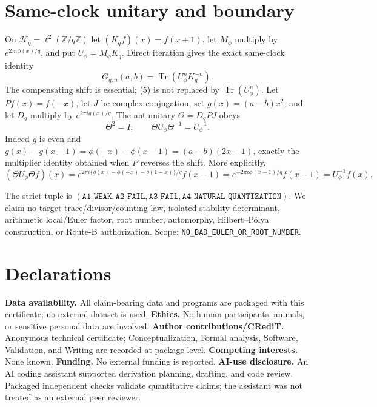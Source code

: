 \documentclass[10pt]{article}
\begin{document}
\section{Same-clock unitary and boundary}
On $\mathcal H_q=\ell^2(\mathbb Z/q\mathbb Z)$ let
$(K_qf)(x)=f(x+1)$, let $M_\phi$ multiply by $e^{2\pi i\phi(x)/q}$, and put
$U_\phi=M_\phi K_q$.  Direct iteration gives the exact same-clock identity
\[
G_{q,n}(a,b)=\operatorname{Tr}(U_\phi^nK_q^{-n}).              \tag{5}
\]
The compensating shift is essential; (5) is not replaced by
$\operatorname{Tr}(U_\phi^n)$.
Let $P f(x)=f(-x)$, let $J$ be complex conjugation, set
$g(x)=(a-b)x^2$, and let $D_g$ multiply by $e^{2\pi ig(x)/q}$.  The
antiunitary $\Theta=D_gPJ$ obeys
\[
\Theta^2=I,\qquad \Theta U_\phi\Theta^{-1}=U_\phi^{-1}.         \tag{6}
\]
Indeed $g$ is even and
$g(x)-g(x-1)=\phi(-x)-\phi(x-1)=(a-b)(2x-1)$, exactly the multiplier
identity obtained when $P$ reverses the shift.  More explicitly,
\[
(\Theta U_\phi\Theta f)(x)
=e^{2\pi i\{g(x)-\phi(-x)-g(1-x)\}/q}f(x-1)
=e^{-2\pi i\phi(x-1)/q}f(x-1)=U_\phi^{-1}f(x).
\]

The strict tuple is $(\texttt{A1\_WEAK},\texttt{A2\_FAIL},
\texttt{A3\_FAIL},\texttt{A4\_NATURAL\_QUANTIZATION})$.
We claim no target trace/divisor/counting law, isolated stability determinant,
arithmetic local/Euler factor, root number, automorphy, Hilbert--P\'olya
construction, or Route-B authorization.  Scope:
\texttt{NO\_BAD\_EULER\_OR\_ROOT\_NUMBER}.

\section*{Declarations}
\textbf{Data availability.} All claim-bearing data and programs are packaged
with this certificate; no external dataset is used.  \textbf{Ethics.} No human
participants, animals, or sensitive personal data are involved.
\textbf{Author contributions/CRediT.} Anonymous technical certificate;
Conceptualization, Formal analysis, Software, Validation, and Writing are
recorded at package level.  \textbf{Competing interests.} None known.
\textbf{Funding.} No external funding is reported.  \textbf{AI-use
disclosure.} An AI coding assistant supported derivation planning, drafting,
and code review.  Packaged independent checks validate quantitative claims;
the assistant was not treated as an external peer reviewer.
\end{document}
